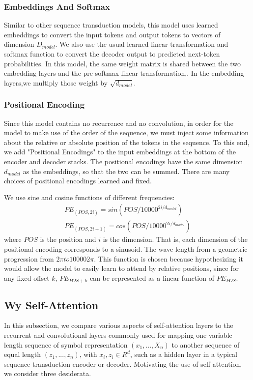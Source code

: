 \documentclass{report}
\begin{document}
\subsubsection{Embeddings And Softmax}
\label{sssec:transformer-embedding-and-softmax}
Similar to other sequence transduction models, this model uses learned embeddings to convert the input tokens and output tokens to vectors of dimension $D_{model}$. We also use the usual learned linear transformation and softmax function to convert the decoder output to predicted next-token probabilities. In this model, the same weight matrix is shared between the two embedding layers and the pre-softmax linear transformation,. In the embedding layers,we multiply those weight by $\sqrt{d_{model}}$.

\subsubsection{Positional Encoding}
\label{sssec:transformer-positional-encoding}
Since this model contains no recurrence and no convolution, in order for the model to make use of the order of the sequence, we must inject some information about the relative or absolute position of the tokens in the sequence. To this end, we add "Positional Encodings" to the input embeddings at the bottom of the encoder and decoder stacks. The positional encodings have the same dimension $d_{model}$ as the embeddings, so that the two can be summed. There are many choices of positional encodings learned and fixed.

We use sine and cosine functions of different frequencies:
\begin{equation*}
	\begin{aligned}
		PE_{(POS, 2i)}=sin(POS/10000^{2i/d_{model}}) \\
		PE_{(POS, 2i+1)}=cos(POS/10000^{2i/d_{model}})
\end{aligned}
\end{equation*}
where $POS$ is the position and $i$ is the dimension. That is, each dimension of the positional encoding corresponds to a sinusoid. The wave length from a geometric progression from $2\pi to 10000 \dot 2\pi$. This function is chosen because hypothesizing it would allow the model to easily learn to attend by relative positions, since for any fixed offset $k$, $PE_{POS+k}$ can be represented as a linear function of $PE_{POS}$.

\iffalse
\subsection{Wy Self-Attention}
\label{ssec:transformer-why-self-attention}
In this subsection, we compare various aspects of self-attention layers to the recurrent and convolutional layers commonly used for mapping one variable-length sequence of symbol representation $(x_1, ..., X_n)$ to another sequence of equal length $(z_1, ..., z_n)$, with $x_i, z_i \in R^d$, such as a hidden layer in a typical sequence transduction encoder or decoder. Motivating the use of self-attention, we consider three desiderata.
\end{document}
